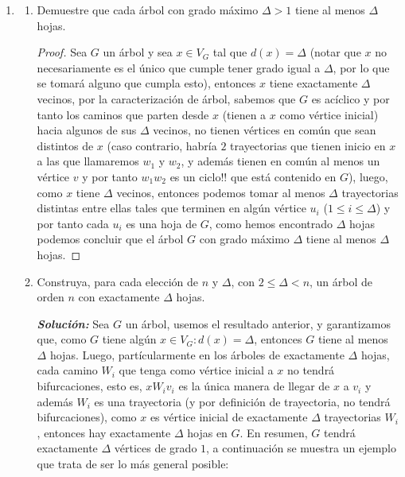 \documentclass{article}
\begin{document}
\begin{enumerate}
  \item \begin{enumerate}
    \item Demuestre que cada \'arbol con grado m\'aximo
      $\Delta > 1$ tiene al menos $\Delta$ hojas.
      \renewcommand\qedsymbol{QED}
      \begin{proof}
      Sea $G$ un \'arbol y sea $x \in V_G$ tal que $d(x) = \Delta$ (notar que $x$
      no necesariamente es el \'unico que cumple tener grado igual a $\Delta$, por
      lo que se tomar\'a alguno que cumpla esto), entonces $x$ tiene exactamente
      $\Delta$ vecinos, por la caracterizaci\'on de \'arbol, sabemos que $G$ es
      ac\'iclico y por tanto los caminos que parten desde $x$ (tienen a $x$
      como v\'ertice inicial) hacia algunos de sus $\Delta$ vecinos, no tienen
      v\'ertices en com\'un que sean distintos de $x$ (caso contrario, habr\'ia $2$
      trayectorias que tienen inicio en $x$ a las que llamaremos $w_1$ y $w_2$, y
      adem\'as tienen en com\'un al menos un v\'ertice $v$ y por tanto $w_1 w_2$ es
      un ciclo!! que est\'a contenido en $G$), luego, como $x$ tiene $\Delta$ vecinos,
      entonces podemos tomar al menos $\Delta$ trayectorias distintas entre ellas
      tales que terminen en alg\'un v\'ertice $u_i$ ($1 \leq i \leq \Delta$) y por
      tanto cada $u_i$ es una hoja de $G$, como hemos encontrado $\Delta$ hojas
      podemos concluir que el \'arbol $G$ con grado m\'aximo $\Delta$ tiene al menos
      $\Delta$ hojas.
      \end{proof}
    \item Construya, para cada elecci\'on de $n$ y $\Delta$,
      con $2\le \Delta < n$, un \'arbol de orden $n$ con
      exactamente $\Delta$ hojas.
      
      \textbf{\textit{Soluci\'on:}} Sea $G$ un \'arbol, usemos el resultado anterior,
      y garantizamos que, como $G$ tiene alg\'un $x \in V_G : d(x) = \Delta$, entonces
      $G$ tiene al menos $\Delta$ hojas. Luego, part\'icularmente en los \'arboles de
      exactamente $\Delta$ hojas, cada camino $W_i$ que tenga como v\'ertice inicial a
      $x$ no tendr\'a bifurcaciones, esto es, $x W_i v_i$ es la \'unica manera de llegar
      de $x$ a $v_i$ y adem\'as $W_i$ es una trayectoria (y por definici\'on de trayectoria,
      no tendr\'a bifurcaciones), como $x$ es v\'ertice inicial de exactamente $\Delta$
      trayectorias $W_i$, entonces hay exactamente $\Delta$ hojas en $G$. En resumen, $G$
      tendr\'a exactamente $\Delta$ v\'ertices de grado $1$, a continuaci\'on se muestra
      un ejemplo que trata de ser lo m\'as general posible:
      

\end{enumerate}
\end{enumerate}
\end{document}
